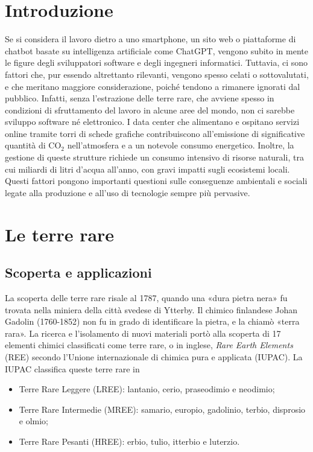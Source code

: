 \documentclass[12pt,a4paper,oneside]{book}
\begin{document}
\restoregeometry




\topmargin=-2cm
\setcounter{page}{1}
\textheight=25cm  %
\tableofcontents

\raggedbottom

\setcounter{chapter}{-1}
\pagestyle{plain}
\chapter{Introduzione}

Se si considera il lavoro dietro a uno smartphone, un sito web o piattaforme di chatbot basate su intelligenza artificiale come ChatGPT, vengono subito in mente le figure degli sviluppatori software e degli ingegneri informatici. Tuttavia, ci sono fattori che, pur essendo altrettanto rilevanti, vengono spesso celati o sottovalutati, e che meritano maggiore considerazione, poiché tendono a rimanere ignorati dal pubblico. Infatti, senza l'estrazione delle terre rare, che avviene spesso in condizioni di sfruttamento del lavoro in alcune aree del mondo, non ci sarebbe sviluppo software né elettronico. I data center che alimentano e ospitano servizi online tramite torri di schede grafiche contribuiscono all'emissione di significative quantità di CO$_2$ nell'atmosfera e a un notevole consumo energetico. Inoltre, la gestione di queste strutture richiede un consumo intensivo di risorse naturali, tra cui miliardi di litri d'acqua all'anno, con gravi impatti sugli ecosistemi locali. Questi fattori pongono importanti questioni sulle conseguenze ambientali e sociali legate alla produzione e all'uso di tecnologie sempre più pervasive.

\chapter{Le terre rare}

\section{Scoperta e applicazioni}

La scoperta delle terre rare risale al 1787, quando una «dura pietra nera» fu trovata nella miniera della città svedese di Ytterby. Il chimico finlandese Johan Gadolin (1760-1852) non fu in grado di identificare la pietra, e la chiamò «terra rara». La ricerca e l'isolamento di nuovi materiali portò alla scoperta di 17 elementi chimici classificati come terre rare, o in inglese, \textit{Rare Earth Elements} (REE) secondo l'Unione internazionale di chimica pura e applicata (IUPAC). La IUPAC classifica queste terre rare in
\begin{itemize}
    \item Terre Rare Leggere (LREE): lantanio, cerio, praseodimio e neodimio;
    \item Terre Rare Intermedie (MREE): samario, europio, gadolinio, terbio, disprosio e olmio;
    \item Terre Rare Pesanti (HREE): erbio, tulio, itterbio e luterzio.
\end{itemize}
\end{document}
